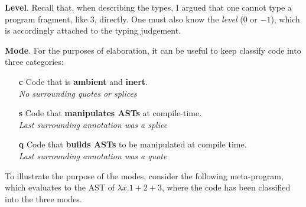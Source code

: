 \textbf{Level}. Recall that, when describing the \efflang{} types, I argued that one cannot type a program fragment, like $3$, directly. One must also know the \textit{level} ($0$ or $-1$), which is accordingly attached to the typing judgement.


\newcommand{\compilemode}{\textbf{\textsf{\textcolor{compile}{c}}}}
\newcommand{\splicemode}{\textbf{\textsf{\textcolor{splice}{s}}}}
\newcommand{\quotemode}{\textbf{\textsf{\textcolor{quote}{q}}}}
\textbf{Mode}. For the purposes of elaboration, it can be useful to keep classify code into three categories:

\begin{enumerate}
  \item[\compilemode] Code that is \textcolor{compile}{\textbf{ambient}} and \textcolor{compile}{\textbf{inert}}.\\
  \textit{No surrounding quotes or splices}
  \item[\splicemode] Code that \textcolor{splice}{\textbf{manipulates ASTs}} at compile-time. \\
  \textit{Last surrounding annotation was a splice}
  \item[\quotemode] Code that \textcolor{quote}{\textbf{builds ASTs}} to be manipulated at compile time. \\
  \textit{Last surrounding annotation was a quote}
\end{enumerate}

To illustrate the purpose of the modes, consider the following meta-program, which evaluates to the AST of $\lambda x. 1+2+3$, where the code has been classified into the three modes.  

